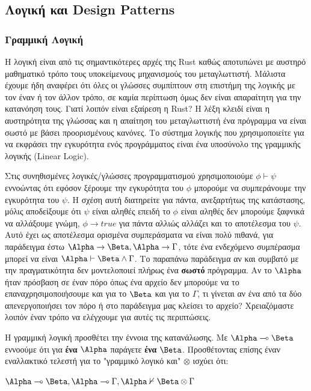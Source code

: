 
\subsection{Λογική και Design Patterns}

\subsubsection{Γραμμική Λογική}

Η λογική είναι από τις σημαντικότερες αρχές της Rust καθώς
αποτυπώνει με αυστηρό μαθηματικό τρόπο τους υποκείμενους
μηχανισμούς του μεταγλωττιστή. Μάλιστα έχουμε ήδη αναφέρει ότι
όλες οι γλώσσες συμπίπτουν στη επιστήμη της λογικής με τον έναν
ή τον άλλον τρόπο, σε καμία περίπτωση όμως δεν είναι απαραίτητη
για την κατανόηση τους. Γιατί λοιπόν είναι εξαίρεση η Rust?
Η λέξη κλειδί είναι η αυστηρότητα της γλώσσας και η απαίτηση του
μεταγλωττιστή ένα πρόγραμμα να είναι σωστό με βάσει προορισμένους
κανόνες. Το σύστημα λογικής που χρησιμοποιείτε για να εκφράσει την
εγκυρότητα ενός προγράμματος είναι ένα υποσύνολο της γραμμικής λογικής
(Linear Logic).

Στις συνηθισμένες λογικές/γλώσσες προγραμματισμού χρησιμοποιούμε $\phi \vdash \psi$
εννοώντας ότι εφόσον ξέρουμε την εγκυρότητα του $\phi$ μπορούμε να συμπεράνουμε
την εγκυρότητα του $\psi$. Η σχέση αυτή διατηρείτε για πάντα, ανεξαρτήτως της
κατάστασης, μόλις αποδείξουμε ότι $\psi$ είναι αληθές επειδή το $\phi$ είναι
αληθές δεν μπορούμε ξαφνικά να αλλάξουμε γνώμη, $\phi \rightarrow true$ για
πάντα αλλιώς αλλάζει και το αποτέλεσμα του $\psi$. Αυτό έχει ως αποτέλεσμα
ορισμένα συμπεράσματα να είναι πολύ πιθανά, για παράδειγμα έστω $\Alpha \rightarrow \Beta,
\Alpha \rightarrow \Gamma$, τότε ένα ενδεχόμενο συμπέρασμα μπορεί να είναι $\Alpha \vdash \Beta \land \Gamma$.
Το παραπάνω παράδειγμα αν και συμβατό με την πραγματικότητα δεν μοντελοποιεί πλήρως
ένα \textbf{σωστό} πρόγραμμα. Αν το $\Alpha$ ήταν πρόσβαση σε έναν πόρο όπως ένα αρχείο
δεν μπορούμε να το επαναχρησιμοποιήσουμε και για το $\Beta$  και για το $\Gamma$, τι γίνεται
αν ένα από τα δύο απενεργοποιήσει τον πόρο ή στο παράδειγμα μας κλείσει το αρχείο? Χρειαζόμαστε
λοιπόν έναν τρόπο να ελέγχουμε για αυτές τις περιπτώσεις.

Η γραμμική λογική προσθέτει την έννοια της κατανάλωσης. Με $\Alpha \multimap \Beta$
εννοούμε ότι για \textbf{ένα} $\Alpha$ παράγετε \textbf{ένα} $\Beta$. Προσθέτοντας
επίσης έναν εναλλακτικό τελεστή για το "γραμμικό λογικό και" $\otimes$ ισχύει ότι:

\begin{center}
    \begin{math}
    \Alpha \multimap \Beta,\Alpha \multimap \Gamma, \Alpha \nvdash \Beta \otimes \Gamma
    \end{math}
\end{center}

